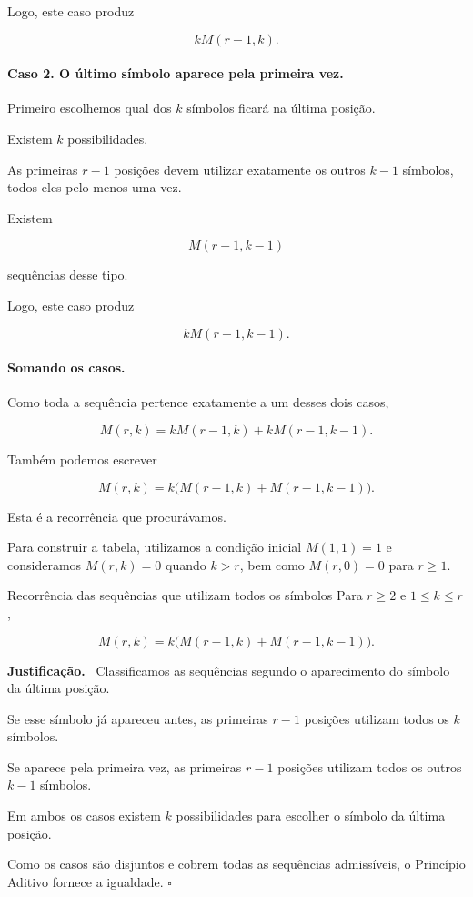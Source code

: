 \documentclass[11pt,a4paper,oneside]{book}
\newcommand{\prova}{\textbf{Justificação.}\ }
\newcommand{\fimprova}{\hfill$\square$}
\begin{document}
Logo, este caso produz

\[
kM(r-1,k).
\]

\paragraph{Caso 2. O último símbolo
aparece pela primeira vez.}

Primeiro escolhemos qual dos $k$
símbolos ficará na última posição.

Existem $k$ possibilidades.

As primeiras $r-1$ posições
devem utilizar exatamente os
outros $k-1$ símbolos, todos eles
pelo menos uma vez.

Existem

\[
M(r-1,k-1)
\]

sequências desse tipo.

Logo, este caso produz

\[
kM(r-1,k-1).
\]

\paragraph{Somando os casos.}

Como toda a sequência pertence
exatamente a um desses dois casos,

\[
\boxed{
M(r,k)=
kM(r-1,k)+kM(r-1,k-1)
}.
\]

Também podemos escrever

\[
\boxed{
M(r,k)=
k\bigl(M(r-1,k)+M(r-1,k-1)\bigr)
}.
\]

Esta é a recorrência que procurávamos.

Para construir a tabela, utilizamos
a condição inicial $M(1,1)=1$
e consideramos $M(r,k)=0$ quando
$k>r$, bem como $M(r,0)=0$
para $r\geq1$.

\begin{teoremabox}{Recorrência das sequências que utilizam todos os símbolos}
Para $r\geq2$ e $1\leq k\leq r$,

\[
\boxed{
M(r,k)=
k\bigl(M(r-1,k)+M(r-1,k-1)\bigr)
}.
\]

\prova
Classificamos as sequências segundo
o aparecimento do símbolo da última posição.

Se esse símbolo já apareceu antes,
as primeiras $r-1$ posições
utilizam todos os $k$ símbolos.

Se aparece pela primeira vez,
as primeiras $r-1$ posições utilizam
todos os outros $k-1$ símbolos.

Em ambos os casos existem $k$
possibilidades para escolher
o símbolo da última posição.

Como os casos são disjuntos
e cobrem todas as sequências admissíveis,
o Princípio Aditivo fornece a igualdade.
\fimprova
\end{teoremabox}
\end{document}
